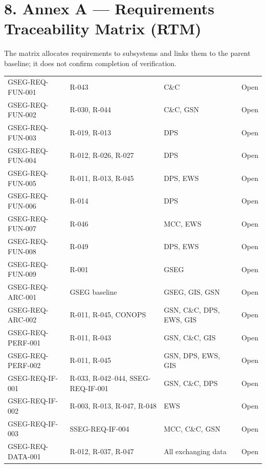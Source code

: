 \section{8. Annex A — Requirements Traceability Matrix (RTM)}\label{annex-a.-requirements-traceability-matrix-rtm}

The matrix allocates requirements to subsystems and links them to the parent baseline; it does not confirm completion of verification.

\begingroup{}
\begin{longtable}{|P{0.27}|P{0.24}|P{0.33}|P{0.16}|}
\hline{}
 &  &  & \\ \hline
\endhead
\hline\endlastfoot
GSEG-REQ-FUN-001 & R-043 & C\&C & Open\\ \hline
GSEG-REQ-FUN-002 & R-030, R-044 & C\&C, GSN & Open\\ \hline
GSEG-REQ-FUN-003 & R-019, R-013 & DPS & Open\\ \hline
GSEG-REQ-FUN-004 & R-012, R-026, R-027 & DPS & Open\\ \hline
GSEG-REQ-FUN-005 & R-011, R-013, R-045 & DPS, EWS & Open\\ \hline
GSEG-REQ-FUN-006 & R-014 & DPS & Open\\ \hline
GSEG-REQ-FUN-007 & R-046 & MCC, EWS & Open\\ \hline
GSEG-REQ-FUN-008 & R-049 & DPS, EWS & Open\\ \hline
GSEG-REQ-FUN-009 & R-001 & GSEG & Open\\ \hline
GSEG-REQ-ARC-001 & GSEG baseline & GSEG, GIS, GSN & Open\\ \hline
GSEG-REQ-ARC-002 & R-011, R-045, CONOPS & GSN, C\&C, DPS, EWS, GIS & Open\\ \hline
GSEG-REQ-PERF-001 & R-011, R-043 & GSN, C\&C, GIS & Open\\ \hline
GSEG-REQ-PERF-002 & R-011, R-045 & GSN, DPS, EWS, GIS & Open\\ \hline
GSEG-REQ-IF-001 & R-033, R-042–044, SSEG-REQ-IF-001 & GSN, C\&C, DPS & Open\\ \hline
GSEG-REQ-IF-002 & R-003, R-013, R-047, R-048 & EWS & Open\\ \hline
GSEG-REQ-IF-003 & SSEG-REQ-IF-004 & MCC, C\&C, GSN & Open\\ \hline
GSEG-REQ-DATA-001 & R-012, R-037, R-047 & All exchanging data & Open\\ \hline

\end{longtable}

